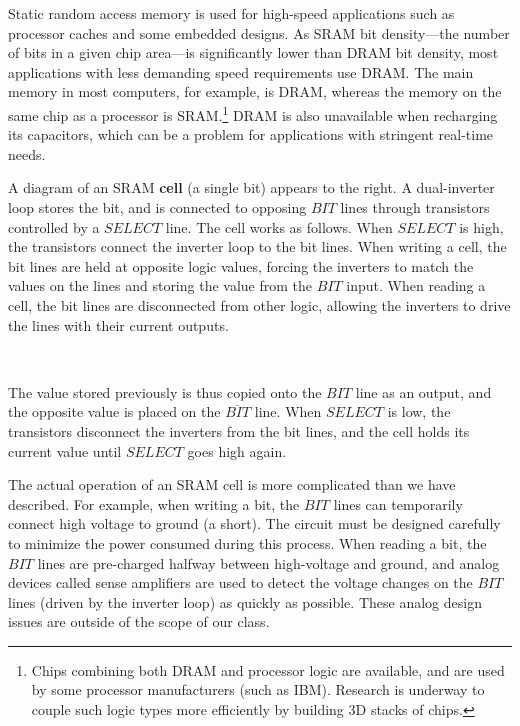 Static random access memory is used for high-speed applications such
as processor caches and some embedded designs.  As SRAM bit
\mbox{density---the} number of bits in a given chip \mbox{area---is}
significantly lower than DRAM bit density, most applications with less
demanding speed requirements use DRAM.  The main memory in most
computers, for example, is DRAM, whereas the memory on the same chip
as a processor is SRAM.\footnote{Chips combining both DRAM and processor
logic are available, and are used by some processor manufacturers (such 
as IBM).  Research is underway to couple such logic types more efficiently
by building 3D stacks of chips.}  DRAM is also unavailable
when recharging its capacitors, which can be a problem for
applications with stringent real-time needs.

\begin{minipage}{4.05in}
A diagram of an SRAM {\bf cell} (a single bit) appears to
the right.  A dual-inverter loop stores the bit, and is connected
to opposing $BIT$ lines through transistors controlled by a $SELECT$
line.  
%
The cell works as follows.  When $SELECT$ is high, the
transistors connect the inverter loop to the bit lines.  When writing
a cell, the bit lines are held at opposite logic values, forcing the
inverters to match the values on the lines and storing the value from
the $BIT$ input.  When reading a cell, the bit lines are disconnected
from other logic, allowing the inverters to drive the lines with
their current outputs.  \linebreak
\end{minipage}\hspace{0.25in}%
\begin{minipage}{2.20in}
\\
\end{minipage}\mpdone

The value stored previously is thus copied onto
the $BIT$ line as an output, and the opposite value is placed on the
$\overline{BIT}$ line.  When $SELECT$ is low, the transistors
disconnect the inverters from the bit lines, and the cell
holds its current value until $SELECT$ goes high again.

The actual operation of an SRAM cell is more complicated than we
have described.  For example, when writing a bit, the $BIT$ lines 
can temporarily connect high voltage to ground (a short).  The 
circuit must be designed carefully to minimize the power consumed
during this process.  When reading a bit, the $BIT$ lines
are pre-charged halfway between high-voltage and ground, and 
analog devices called sense amplifiers are used to detect the
voltage changes on the $BIT$ lines (driven by the inverter loop)
as quickly as possible.  These analog design issues are outside of 
the scope of our class.

